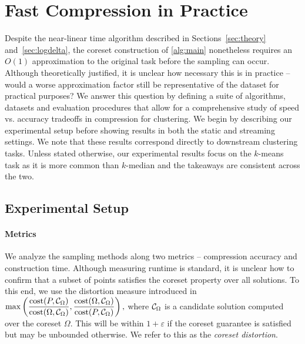 \section{Fast Compression in Practice}
\label{sec:results}

Despite the near-linear time algorithm described in Sections~\ref{sec:theory} and~\ref{sec:logdelta}, the coreset construction of \cref{alg:main} nonetheless
requires an $O(1)$ approximation to the original task before the sampling can occur. Although theoretically justified, it is unclear how necessary this is in
practice -- would a worse approximation factor still be representative of the dataset for practical purposes? We answer this question by defining a suite of
algorithms, datasets and evaluation procedures that allow for a comprehensive study of speed vs. accuracy tradeoffs in compression for clustering.  We begin by
describing our experimental setup before showing results in both the static and streaming settings.  We note that these results correspond directly to
downstream clustering tasks. Unless stated otherwise, our experimental results focus on the $k$-means task as it is more common than $k$-median and the
takeaways are consistent across the two.

\subsection{Experimental Setup}
\paragraph*{Metrics}
\label{sssec:metrics}

We analyze the sampling methods along two metrics -- compression accuracy and construction time. Although measuring runtime is standard, it is unclear how to
confirm that a subset of points satisfies the coreset property over all solutions. To this end, we use the distortion measure introduced in~\cite{chrisESA} $
\max \left( \dfrac{\operatorname{cost}(P, \mathcal C_{\Omega})}{\operatorname{cost}(\Omega, \mathcal C_{\Omega})}, \dfrac{\operatorname{cost}(\Omega, \mathcal C_{\Omega})}{\operatorname{cost}(P, \mathcal C_{\Omega})} \right),$ where
$\mathcal C_{\Omega}$ is a candidate solution computed over the coreset $\Omega$. This will be within $1+\varepsilon$ if the coreset guarantee is satisfied
but may be unbounded otherwise.  We refer to this as the \emph{coreset distortion}.

